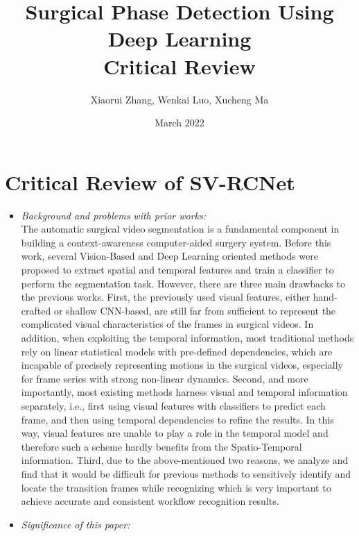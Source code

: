 \documentclass[11pt]{article} \usepackage[top=1in, bottom=1in, left=1in, right=1in]{geometry}
\title{Surgical Phase Detection Using Deep Learning\\ Critical Review}
\author{Xiaorui Zhang, Wenkai Luo, Xucheng Ma}
\date{March 2022}
\begin{document}
\maketitle
\section{Critical Review of SV-RCNet}
\begin{itemize}
    \item \textit{Background and problems with prior works:}\\
    The automatic surgical video segmentation is a fundamental component in building a context-awareness computer-aided surgery system.  Before this work, several Vision-Based and Deep Learning oriented methods were proposed to extract spatial and temporal features and train a classifier to perform the segmentation task. However, there are three main drawbacks to the previous works.  First, the previously used visual features, either hand-crafted or shallow CNN-based, are still far from sufficient to represent the complicated visual characteristics of the frames in surgical videos. In addition, when exploiting the temporal information, most traditional methods rely on linear statistical models with pre-defined dependencies, which are incapable of precisely representing motions in the surgical videos, especially for frame series with strong non-linear dynamics. Second, and more importantly, most existing methods harness visual and temporal information separately, i.e., first using visual features with classifiers to predict each frame, and then using temporal dependencies to refine the results. In this way, visual features are unable to play a role in the temporal model and therefore such a scheme hardly benefits from the Spatio-Temporal information. Third, due to the above-mentioned two reasons, we analyze and find that it would be difficult for previous methods to sensitively identify and locate the transition frames while recognizing which is very important to achieve accurate and consistent workflow recognition results. \cite{SV-RCNet}
    \item \textit{Significance of this paper:}\\

\end{itemize}
\end{document}
